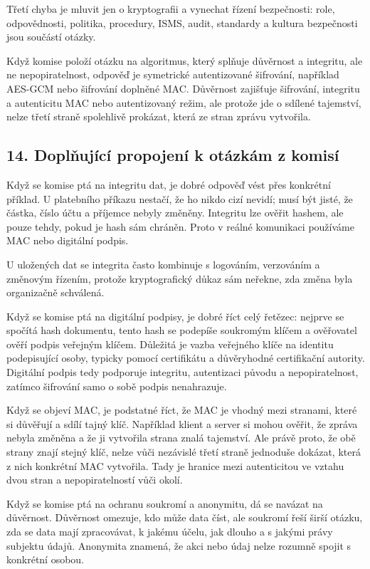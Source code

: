 Třetí chyba je mluvit jen o kryptografii a vynechat řízení bezpečnosti: role, odpovědnosti, politika, procedury, ISMS, audit, standardy a kultura bezpečnosti jsou součástí otázky.

Když komise položí otázku na algoritmus, který splňuje důvěrnost a integritu, ale ne nepopiratelnost, odpověď je symetrické autentizované šifrování, například AES-GCM nebo šifrování doplněné MAC. Důvěrnost zajišťuje šifrování, integritu a autenticitu MAC nebo autentizovaný režim, ale protože jde o sdílené tajemství, nelze třetí straně spolehlivě prokázat, která ze stran zprávu vytvořila.

\subsection*{14. Doplňující propojení k otázkám z komisí}

Když se komise ptá na integritu dat, je dobré odpověď vést přes konkrétní příklad. U platebního příkazu nestačí, že ho nikdo cizí nevidí; musí být jisté, že částka, číslo účtu a příjemce nebyly změněny. Integritu lze ověřit hashem, ale pouze tehdy, pokud je hash sám chráněn. Proto v reálné komunikaci používáme MAC nebo digitální podpis.

U uložených dat se integrita často kombinuje s logováním, verzováním a změnovým řízením, protože kryptografický důkaz sám neřekne, zda změna byla organizačně schválená.

Když se komise ptá na digitální podpisy, je dobré říct celý řetězec: nejprve se spočítá hash dokumentu, tento hash se podepíše soukromým klíčem a ověřovatel ověří podpis veřejným klíčem. Důležitá je vazba veřejného klíče na identitu podepisující osoby, typicky pomocí certifikátu a důvěryhodné certifikační autority. Digitální podpis tedy podporuje integritu, autentizaci původu a nepopiratelnost, zatímco šifrování samo o sobě podpis nenahrazuje.

Když se objeví MAC, je podstatné říct, že MAC je vhodný mezi stranami, které si důvěřují a sdílí tajný klíč. Například klient a server si mohou ověřit, že zpráva nebyla změněna a že ji vytvořila strana znalá tajemství. Ale právě proto, že obě strany znají stejný klíč, nelze vůči nezávislé třetí straně jednoduše dokázat, která z nich konkrétní MAC vytvořila. Tady je hranice mezi autenticitou ve vztahu dvou stran a nepopiratelností vůči okolí.

Když se komise ptá na ochranu soukromí a anonymitu, dá se navázat na důvěrnost. Důvěrnost omezuje, kdo může data číst, ale soukromí řeší širší otázku, zda se data mají zpracovávat, k jakému účelu, jak dlouho a s jakými právy subjektu údajů. Anonymita znamená, že akci nebo údaj nelze rozumně spojit s konkrétní osobou.

